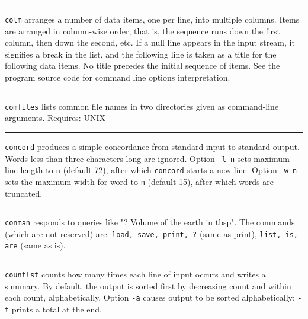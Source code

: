 {\vspace{0.25cm}\hrule{}

\texttt{colm} arranges a number of data items, one per line, into
multiple columns. Items are arranged in column-wise order, that is, the
sequence runs down the first column, then down the second, etc. If a
null line appears in the input stream, it signifies a break in the
list, and the following line is taken as a title for the following data
items. No title precedes the initial sequence of items.  See the program
source code for command line options interpretation.


\vspace{0.25cm}\hrule{}

\texttt{comfiles} lists common file names in two directories given as
command-line arguments. Requires: UNIX 

\vspace{0.25cm}\hrule{}

\texttt{concord} produces a simple concordance from standard input to
standard output. Words less than three characters long are ignored.
Option \texttt{{}-l n} sets maximum line length to
n (default 72), after which \texttt{concord} starts a new line. Option
\texttt{{}-w n} sets the maximum width for word to \texttt{n}
(default 15), after which words are truncated.

\vspace{0.25cm}\hrule{}

\texttt{conman} responds to queries like "? Volume of the
earth in tbsp". The commands (which are
not reserved) are: \texttt{load, save, print, ?} (same as print),
\texttt{list, is, are} (same as is).

\vspace{0.25cm}\hrule{}

\texttt{countlst} counts how many times each line of input occurs and
writes a summary. By default, the output is sorted first by
decreasing count and within each count, alphabetically. Option
\texttt{{}-a} causes output to be sorted alphabetically;
\texttt{{}-t} prints a total at the end.

}
